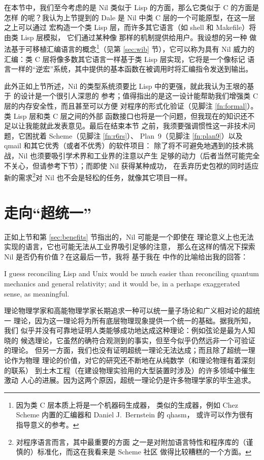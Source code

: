 在本节中，我们至今考虑的是 Nil 类似于 Lisp 的方面，那么它类似于 C 的方面是怎样
的呢？我认为上节提到的 Dale 是 Nil 中类 C 层的一个可能原型，在这一层之上可以通过
宏构造一个类 Lisp 层，而许多其它语言（如 shell 和 Makefile）将由类 Lisp 层模拟，
它们通过某种像  那样的机制提供给用户。我设想的另一种
做法基于可移植汇编语言的概念\footnote{因为类 C 层本质上将是一个机器码生成器，
类似的生成器，例如 Chez Scheme 内置的汇编器和 Daniel J.\ Bernstein 的 qhasm，
或许可以作为很有指导意义的参考。}（见第 \ref{sec:wib} 节），它可以称为具有 Nil
威力的汇编：类 C 层将像多数其它语言一样基于类 Lisp 层实现，它将是一个像标记
语言一样的“逆宏”系统，其中提供的基本函数在被调用时将汇编指令发送到输出。

此外正如上节所述，Nil 的类型系统须要比 Lisp 中的更强，就此我认为王垠的基于%
的设计是一个很引人深思的
参考；值得指出的是这一设计能帮助我们增强类 C 层的内存安全性，而且甚至可以方便
对程序的形式化验证（见脚注 \ref{fn:formal}）。类 Lisp 层和类 C 层之间的外部
函数接口也将是一个问题，但我现在的知识还不足以让我能就此发表意见。最后在结束本节
之前，我须要强调惯性这一非技术问题，它困扰着 Scheme（见脚注 \ref{fn:r6rs}）、%
Plan~9（见脚注 \ref{fn:plan9}）以及 qmail 和其它优秀（或者不优秀）的软件项目：
除了将不可避免地遇到的技术挑战，Nil 也须要吸引学术界和工业界的注意以产生
足够的动力（后者当然可能完全不关心，但请参考下节）；而即使 Nil 获得某种成功，
在丢弃历史包袱的同时适应新的需求\footnote{对程序语言而言，其中最重要的方面
之一是对附加语言特性和程序库的（谨慎的）标准化，而这在我看来是 Scheme 社区
做得比较糟糕的一个方面。}对 Nil 也不会是轻松的任务，就像其它项目一样。

\section{走向“超统一”}\label{sec:toe}

正如上节和第 \ref{sec:benefits} 节指出的，Nil 可能是一个即使在
理论意义上也无法实现的语言，它也可能无法从工业界吸引足够的注意，
那么在这样的情况下探索 Nil 是否仍有价值？在这最后一节，我将
基于我在 \parencite{vector2018c} 中作的比喻给出我的回答：
\begin{quoting}
	I guess reconciling Lisp and Unix would be much easier than
	reconciling quantum mechanics and general relativity; and
	it would be, in a perhaps exaggerated sense, as meaningful.
\end{quoting}

理论物理学家和高能物理学家长期追求一种可以统一量子场论和广义相对论的超统一
理论，因为这一理论将为所有底层物理现象提供一个统一的基础。据我所知，我们
似乎并没有可靠地证明人类能够成功地达成这种理论：例如弦论是最为人知晓的
候选理论，它虽然的确符合观测到的事实，但至今似乎仍然远非一个可验证的理论。
但另一方面，我们也没有证明超统一理论无法达成；而且除了超统一理论作为物理
理论的价值，对它的研究还不断地在从纯数学（和理论物理有着深刻的联系）
到土木工程（在建设物理实验用的大型装置时涉及）的许多领域中催生激动
人心的进展。因为这两个原因，超统一理论仍是许多物理学家的毕生追求。

